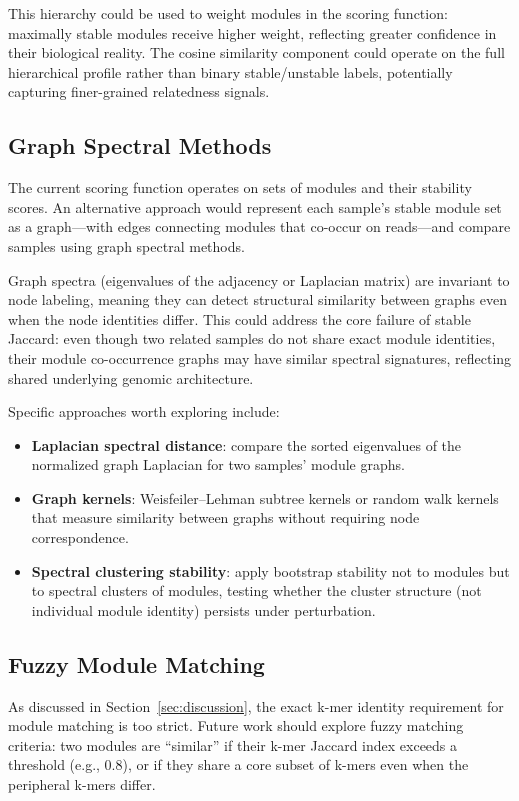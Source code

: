 \documentclass{../yalumba}
\begin{document}
This hierarchy could be used to weight modules in the scoring function:
maximally stable modules receive higher weight, reflecting greater confidence
in their biological reality.  The cosine similarity component could operate
on the full hierarchical profile rather than binary stable/unstable labels,
potentially capturing finer-grained relatedness signals.

\subsection{Graph Spectral Methods}

The current scoring function operates on sets of modules and their stability
scores.  An alternative approach would represent each sample's stable module
set as a graph---with edges connecting modules that co-occur on reads---and
compare samples using graph spectral methods.

Graph spectra (eigenvalues of the adjacency or Laplacian matrix) are invariant
to node labeling, meaning they can detect structural similarity between graphs
even when the node identities differ.  This could address the core failure of
stable Jaccard: even though two related samples do not share exact module
identities, their module co-occurrence graphs may have similar spectral
signatures, reflecting shared underlying genomic architecture.

Specific approaches worth exploring include:

\begin{itemize}
  \item \textbf{Laplacian spectral distance}: compare the sorted eigenvalues of
    the normalized graph Laplacian for two samples' module graphs.
  \item \textbf{Graph kernels}: Weisfeiler--Lehman subtree kernels or random
    walk kernels that measure similarity between graphs without requiring
    node correspondence.
  \item \textbf{Spectral clustering stability}: apply bootstrap stability not
    to modules but to spectral clusters of modules, testing whether the
    cluster structure (not individual module identity) persists under
    perturbation.
\end{itemize}

\subsection{Fuzzy Module Matching}

As discussed in Section~\ref{sec:discussion}, the exact k-mer identity
requirement for module matching is too strict.  Future work should explore
fuzzy matching criteria: two modules are ``similar'' if their k-mer Jaccard
index exceeds a threshold (e.g., 0.8), or if they share a core subset of
k-mers even when the peripheral k-mers differ.
\end{document}
